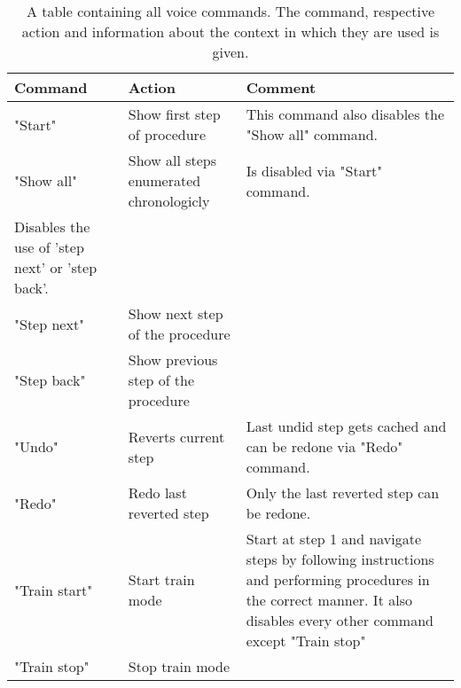 \begin{table}[ht]
    \begin{center}
        \begin{tabular}{ | l | p{4cm} | p{8cm} |}
        \hline
        Command & Action & Comment \\ \hline
        "Start" & Show first step of procedure & This command also disables the "Show all" command. \\ \hline
        "Show all" & Show all steps enumerated chronologicly & Is disabled via "Start" command. \\
        Disables the use of 'step next' or 'step back'. \\ \hline
        "Step next" & Show next step of the procedure & \\ \hline
        "Step back" & Show previous step of the procedure & \\ \hline
        "Undo" & Reverts current step & Last undid step gets cached and can be redone via "Redo" command. \\ \hline
        "Redo" & Redo last reverted step & Only the last reverted step can be redone. \\ \hline
        "Train start" & Start train mode & Start at step 1 and navigate steps by following instructions and performing procedures in the correct manner.
        It also disables every other command except "Train stop" \\ \hline
        "Train stop" & Stop train mode & \\ \hline
        \end{tabular}
    \end{center}
    \caption{\label{table::VoiceCommands}A table containing all voice commands. The command, respective action and information about the context in which they are used is given.}
\end{table}

